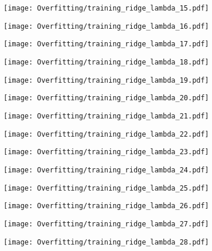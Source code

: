 \documentclass[xcolor=pdftex,dvipsnames,table]{beamer}
\begin{document}
\frame
{
	\begin{center}
		\texttt{[image: Overfitting/training\_ridge\_lambda\_15.pdf]}
	\end{center}
}
\frame
{
	\begin{center}
		\texttt{[image: Overfitting/training\_ridge\_lambda\_16.pdf]}
	\end{center}
}
\frame
{
	\begin{center}
		\texttt{[image: Overfitting/training\_ridge\_lambda\_17.pdf]}
	\end{center}
}
\frame
{
	\begin{center}
		\texttt{[image: Overfitting/training\_ridge\_lambda\_18.pdf]}
	\end{center}
}
\frame
{
	\begin{center}
		\texttt{[image: Overfitting/training\_ridge\_lambda\_19.pdf]}
	\end{center}
}
\frame
{
	\begin{center}
		\texttt{[image: Overfitting/training\_ridge\_lambda\_20.pdf]}
	\end{center}
}
\frame
{
	\begin{center}
		\texttt{[image: Overfitting/training\_ridge\_lambda\_21.pdf]}
	\end{center}
}
\frame
{
	\begin{center}
		\texttt{[image: Overfitting/training\_ridge\_lambda\_22.pdf]}
	\end{center}
}
\frame
{
	\begin{center}
		\texttt{[image: Overfitting/training\_ridge\_lambda\_23.pdf]}
	\end{center}
}
\frame
{
	\begin{center}
		\texttt{[image: Overfitting/training\_ridge\_lambda\_24.pdf]}
	\end{center}
}
\frame
{
	\begin{center}
		\texttt{[image: Overfitting/training\_ridge\_lambda\_25.pdf]}
	\end{center}
}
\frame
{
	\begin{center}
		\texttt{[image: Overfitting/training\_ridge\_lambda\_26.pdf]}
	\end{center}
}
\frame
{
	\begin{center}
		\texttt{[image: Overfitting/training\_ridge\_lambda\_27.pdf]}
	\end{center}
}
\frame
{
	\begin{center}
		\texttt{[image: Overfitting/training\_ridge\_lambda\_28.pdf]}
	\end{center}
}
\end{document}
